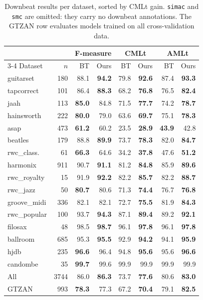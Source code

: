 \begin{table}[t]
  \centering
  \caption{Downbeat results per dataset, sorted by CMLt gain. \texttt{simac} and \texttt{smc} are omitted: they carry no downbeat annotations.
  The GTZAN row evaluates models trained on all cross-validation data.}
  \label{tab:perdatasetdownbeat}
  \footnotesize
  \setlength{\tabcolsep}{3.5pt}
  \begin{tabular}{@{}lr rr rr rr@{}}
    \hline
    & & \multicolumn{2}{c}{F-measure} & \multicolumn{2}{c}{CMLt} & \multicolumn{2}{c}{AMLt} \\
    \cline{3-4}\cline{5-6}\cline{7-8}
    Dataset & $n$ & BT & Ours & BT & Ours & BT & Ours \\
    \hline
    guitarset & 180 & 88.1 & \textbf{94.2} & 79.8 & \textbf{92.6} & 87.4 & \textbf{93.3} \\
    tapcorrect & 101 & 86.4 & \textbf{88.3} & 68.2 & \textbf{76.8} & 76.5 & \textbf{82.4} \\
    jaah & 113 & \textbf{85.0} & 84.8 & 71.5 & \textbf{77.7} & 74.2 & \textbf{78.7} \\
    hainsworth & 222 & \textbf{80.0} & 79.0 & 63.6 & \textbf{69.7} & 75.1 & \textbf{78.3} \\
    asap & 473 & \textbf{61.2} & 60.2 & 23.5 & \textbf{28.9} & \textbf{43.9} & 42.8 \\
    beatles & 179 & 88.8 & \textbf{89.9} & 73.7 & \textbf{78.3} & 82.0 & \textbf{84.7} \\
    rwc\_class. & 61 & \textbf{66.3} & 64.6 & 34.2 & \textbf{37.8} & 47.6 & \textbf{51.2} \\
    harmonix & 911 & 90.7 & \textbf{91.1} & 81.2 & \textbf{84.8} & 85.9 & \textbf{89.6} \\
    rwc\_royalty & 15 & 91.9 & \textbf{92.2} & 82.2 & \textbf{85.7} & 82.2 & \textbf{88.7} \\
    rwc\_jazz & 50 & \textbf{80.7} & 80.6 & 71.3 & \textbf{74.4} & 76.7 & \textbf{76.8} \\
    groove\_midi & 336 & 82.1 & 82.1 & 72.7 & \textbf{75.5} & 81.9 & \textbf{84.3} \\
    rwc\_popular & 100 & 93.7 & \textbf{94.3} & 87.1 & \textbf{89.4} & 89.2 & \textbf{92.1} \\
    filosax & 48 & 98.5 & \textbf{98.7} & 96.1 & \textbf{97.8} & 96.1 & \textbf{97.8} \\
    ballroom & 685 & 95.3 & \textbf{95.5} & 92.9 & \textbf{94.2} & 94.1 & \textbf{95.9} \\
    hjdb & 235 & \textbf{96.6} & 96.4 & 94.8 & \textbf{95.6} & 95.6 & \textbf{96.6} \\
    candombe & 35 & \textbf{99.7} & 99.6 & 99.9 & 99.9 & 99.9 & 99.9 \\
    \hline All & 3744 & 86.0 & \textbf{86.3} & 73.7 & \textbf{77.6} & 80.6 & \textbf{83.0} \\
    \hline GTZAN & 993 & \textbf{78.3} & 77.3 & 67.2 & \textbf{70.4} & 79.1 & \textbf{82.5} \\
    \hline
  \end{tabular}
\end{table}

